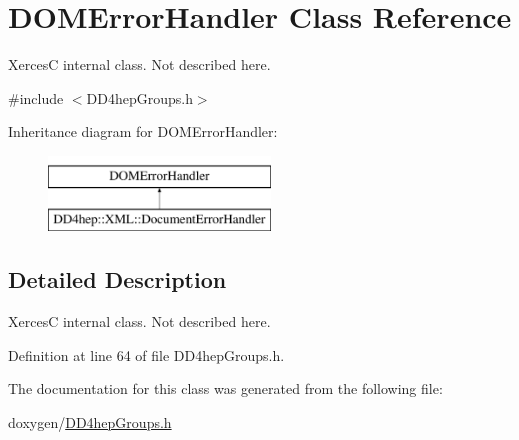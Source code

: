\hypertarget{class_d_o_m_error_handler}{}\section{D\+O\+M\+Error\+Handler Class Reference}
\label{class_d_o_m_error_handler}


XercesC internal class. Not described here.  




{\ttfamily \#include $<$D\+D4hep\+Groups.\+h$>$}

Inheritance diagram for D\+O\+M\+Error\+Handler\+:\begin{figure}[H]
\begin{center}
\leavevmode
\includegraphics[height=2.000000cm]{class_d_o_m_error_handler}
\end{center}
\end{figure}


\subsection{Detailed Description}
XercesC internal class. Not described here. 

Definition at line 64 of file D\+D4hep\+Groups.\+h.



The documentation for this class was generated from the following file\+:\begin{DoxyCompactItemize}
\item 
doxygen/\hyperlink{_d_d4hep_groups_8h}{D\+D4hep\+Groups.\+h}\end{DoxyCompactItemize}
